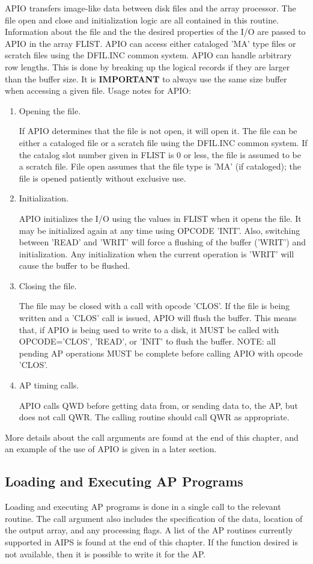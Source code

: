 APIO transfers image-like data between disk files and the array
processor.  The file open and close and initialization logic are all
contained in this routine. Information about the file and the the
desired properties of the I/O are passed to APIO in the array FLIST.
APIO can access either cataloged 'MA' type files or scratch files
using the DFIL.INC common system. APIO can handle arbitrary row
lengths.  This is done by breaking up the logical records if they are
larger than the buffer size. It is {\bf IMPORTANT} to always use the
same size buffer when accessing a given file.  Usage notes for APIO:
\begin{enumerate} %
\item Opening the file.

If APIO determines that the file is not open, it will open it.  The
file can be either a cataloged file or a scratch file using the
DFIL.INC common system.  If the catalog slot number given in FLIST is
0 or less, the file is assumed to be a scratch file. File open assumes
that the file type is 'MA' (if cataloged); the file is opened
patiently without exclusive use.
\item Initialization.

APIO initializes the I/O using the values in FLIST when it opens the
file.  It may be initialized again at any time using OPCODE 'INIT'.
Also, switching between 'READ' and 'WRIT' will force a flushing of the
buffer ('WRIT') and initialization.  Any initialization when the
current operation is 'WRIT' will cause the buffer to be flushed.
\item Closing the file.

The file may be closed with a call with opcode 'CLOS'.  If the file is
being written and a 'CLOS' call is issued, APIO will flush the buffer.
This means that, if APIO is being used to write to a disk, it MUST be
called with OPCODE='CLOS', 'READ', or 'INIT' to flush the buffer.
NOTE: all pending AP operations MUST be complete before calling APIO
with opcode 'CLOS'.
\item AP timing calls.

APIO calls QWD before getting data from, or sending data to, the AP,
but does not call QWR.  The calling routine should call QWR as
appropriate.
\end{enumerate} %
More details about the call arguments are found at the end of this
chapter, and an example of the use of APIO is given in a later
section.

\subsection{Loading and Executing AP Programs }
Loading and executing AP programs is done in a single call to the
relevant routine.  The call argument also includes the specification
of the data, location of the output array, and any processing flags. A
list of the AP routines currently supported in AIPS is found at the
end of this chapter.  If the function desired is not available, then
it is possible to write it for the AP.

